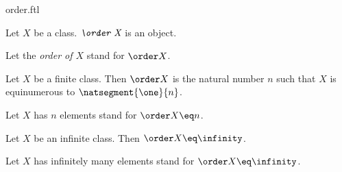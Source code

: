\documentclass{stex}
\begin{document}
\begin{smodule}{order.ftl}



\begin{signature}[forthel,id=OrderSig]
  Let $X$ be a class.
  $\emph{\order X}$ is an object.

  Let the \emph{order of $X$} stand for $\order X$.
\end{signature}

\begin{axiom}[forthel,id=OrderOfFiniteClassAx]
  Let $X$ be a finite class.
  Then $\order X$ is the natural number $n$ such that $X$ is equinumerous to $\natsegment{\one}{n}$.

  Let $X$ has $n$ elements stand for $\order X \eq n$.
\end{axiom}

\begin{axiom}[forthel,id=OrderOfInfiniteClassAx]
  Let $X$ be an infinite class.
  Then $\order X \eq \infinity$.

  Let $X$ has infinitely many elements stand for $\order X \eq \infinity$.
\end{axiom}

\end{smodule}
\end{document}
